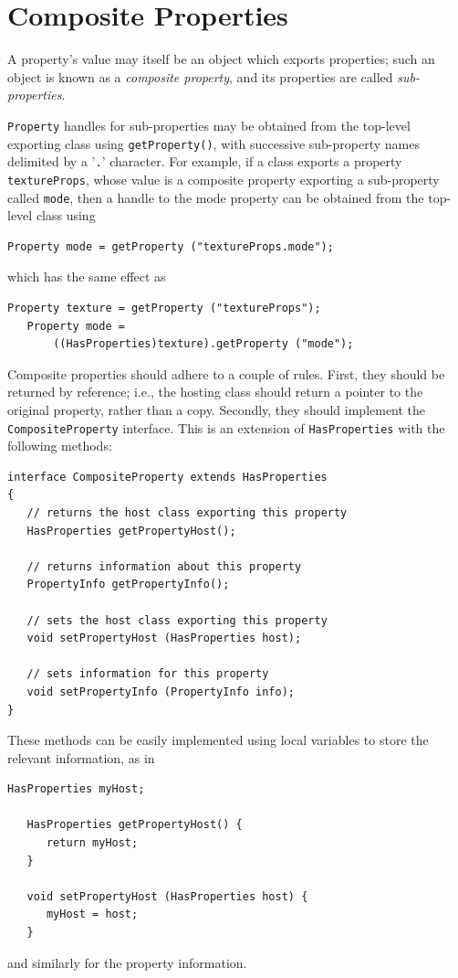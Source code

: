 \label{compositeSec}
\section{Composite Properties }

A property's value may itself be an object which exports properties;
such an object is known as a {\it composite property}, and
its properties are called {\it sub-properties}.

{\tt Property} handles for sub-properties may be obtained from the
top-level exporting class using {\tt getProperty()}, with successive
sub-property names delimited by a '{\tt .}' character.  For example,
if a class exports a property {\tt textureProps}, whose value is a
composite property exporting a sub-property called {\tt mode}, then a
handle to the mode property can be obtained from the top-level class
using
\begin{lstlisting}[]
   Property mode = getProperty ("textureProps.mode");    
\end{lstlisting}
which has the same effect as
\begin{lstlisting}[]
   Property texture = getProperty ("textureProps");    
   Property mode = 
       ((HasProperties)texture).getProperty ("mode");
\end{lstlisting}

Composite properties should adhere to a couple of rules.  First, they
should be returned by reference; i.e., the hosting class should return
a pointer to the original property, rather than a copy.
Secondly, they should implement the {\tt CompositeProperty}
interface.  This is an extension of {\tt HasProperties} with the
following methods:
\begin{lstlisting}[]
interface CompositeProperty extends HasProperties
{   
   // returns the host class exporting this property
   HasProperties getPropertyHost();

   // returns information about this property
   PropertyInfo getPropertyInfo();

   // sets the host class exporting this property
   void setPropertyHost (HasProperties host);

   // sets information for this property
   void setPropertyInfo (PropertyInfo info);
}
\end{lstlisting}
These methods can be easily implemented using local variables to store
the relevant information, as in
\begin{lstlisting}[]
   HasProperties myHost;

   HasProperties getPropertyHost() {
      return myHost;
   }

   void setPropertyHost (HasProperties host) {
      myHost = host;
   }
\end{lstlisting}
and similarly for the property information.


